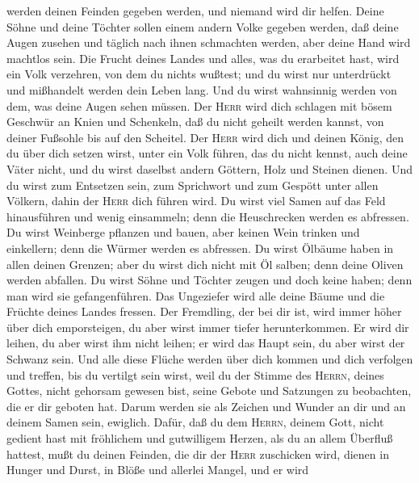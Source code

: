 werden deinen Feinden gegeben werden, und niemand wird dir helfen.
 Deine Söhne und deine Töchter sollen einem andern Volke
gegeben werden, daß deine Augen zusehen und täglich nach ihnen
schmachten werden, aber deine Hand wird machtlos sein. 
Die Frucht deines Landes und alles, was du erarbeitet hast, wird ein
Volk verzehren, von dem du nichts wußtest; und du wirst nur unterdrückt
und mißhandelt werden dein Leben lang.  Und du wirst
wahnsinnig werden von dem, was deine Augen sehen müssen. 
Der \textsc{Herr} wird dich schlagen mit bösem Geschwür an Knien und
Schenkeln, daß du nicht geheilt werden kannst, von deiner Fußsohle bis
auf den Scheitel.  Der \textsc{Herr} wird dich und deinen
König, den du über dich setzen wirst, unter ein Volk führen, das du
nicht kennst, auch deine Väter nicht, und du wirst daselbst andern
Göttern, Holz und Steinen dienen.  Und du wirst zum
Entsetzen sein, zum Sprichwort und zum Gespött unter allen Völkern,
dahin der \textsc{Herr} dich führen wird.  Du wirst viel
Samen auf das Feld hinausführen und wenig einsammeln; denn die
Heuschrecken werden es abfressen.  Du wirst Weinberge
pflanzen und bauen, aber keinen Wein trinken und einkellern; denn die
Würmer werden es abfressen.  Du wirst Ölbäume haben in
allen deinen Grenzen; aber du wirst dich nicht mit Öl salben; denn deine
Oliven werden abfallen.  Du wirst Söhne und Töchter
zeugen und doch keine haben; denn man wird sie gefangenführen.
 Das Ungeziefer wird alle deine Bäume und die Früchte
deines Landes fressen.  Der Fremdling, der bei dir ist,
wird immer höher über dich emporsteigen, du aber wirst immer tiefer
herunterkommen.  Er wird dir leihen, du aber wirst ihm
nicht leihen; er wird das Haupt sein, du aber wirst der Schwanz sein.
 Und alle diese Flüche werden über dich kommen und dich
verfolgen und treffen, bis du vertilgt sein wirst, weil du der Stimme
des \textsc{Herrn}, deines Gottes, nicht gehorsam gewesen bist, seine
Gebote und Satzungen zu beobachten, die er dir geboten hat.
 Darum werden sie als Zeichen und Wunder an dir und an
deinem Samen sein, ewiglich.  Dafür, daß du dem
\textsc{Herrn}, deinem Gott, nicht gedient hast mit fröhlichem und
gutwilligem Herzen, als du an allem Überfluß hattest, 
mußt du deinen Feinden, die dir der \textsc{Herr} zuschicken wird,
dienen in Hunger und Durst, in Blöße und allerlei Mangel, und er wird
